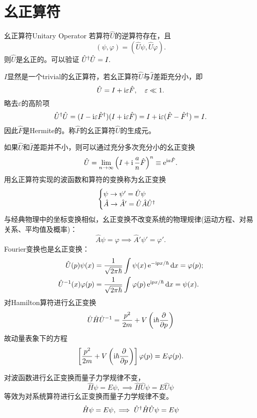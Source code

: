 \section{幺正算符}
\begin{definition}{幺正算符}{Unitary Operator}
	若算符$\hat U$的逆算符存在，且
	\[
		(\psi,\varphi)=(\hat U\psi,\hat U\varphi).
\]
	则$\hat U$是幺正的。可以验证
	$\hat U^\dagger\hat U=I.$
\end{definition}
$I$显然是一个trivial的幺正算符，若幺正算符$\hat U$与$\hat I$差距充分小，即
\[
	\hat U=I+\mathrm{i}\varepsilon\hat F,\quad\varepsilon\ll 1.
\]
略去$\varepsilon$的高阶项
\[
	\hat U^\dagger\hat U=(I-\mathrm{i}\varepsilon\hat F^\dagger)(I+\mathrm{i}\varepsilon\hat F)=I+\mathrm{i}\varepsilon(\hat F-\hat F^\dagger)=I.
\]
因此$\hat F$是Hermite的。称$\hat F$的幺正算符$\hat U$的生成元。

如果$\hat U$和$\hat I$差距并不小，则可以通过充分多次充分小的幺正变换
\begin{align}
	\hat U=\lim_{n\to\infty}\left(I+\mathrm{i}\,\frac an\hat F\right)^n\equiv\mathop{}\!\mathrm{e}^{\mathrm{i} a\hat F}.
\end{align}
用幺正算符实现的波函数和算符的变换称为幺正变换
\begin{align}
	\begin{cases}
		\psi\to\psi'=\hat U\psi\\
		\hat A\to\hat A'=\hat U\hat A\hat U^\dagger
	\end{cases}
\end{align}
与经典物理中的坐标变换相似，幺正变换不改变系统的物理规律(运动方程、对易关系、平均值及概率)：
\[
	\hat A\psi=\varphi\implies\hat A'\psi'=\varphi'.
\]
Fourier变换也是幺正变换：
\begin{align}
	\hat U(p)\psi(x)&=\frac1{\sqrt{2\pi\hbar}}\int\psi(x)\mathop{}\!\mathrm{e}^{-\mathrm{i} px/\hbar}\mathop{}\!\mathrm{d} x=\varphi(p);\\
	\hat U^{-1}(x)\varphi(p)&=\frac1{\sqrt{2\pi\hbar}}\int\varphi(p)\mathop{}\!\mathrm{e}^{\mathrm{i} px/\hbar}\mathop{}\!\mathrm{d} x=\psi(x).
\end{align}
对Hamilton算符进行幺正变换
\begin{align}
	\hat U\hat H\hat U^{-1}=\frac{p^2}{2m}+V\left(\mathrm{i}\hbar\frac{\partial^{{}}}{\partial{p}^{{}}}\right)
\end{align}
故动量表象下的\Schr 方程 
\begin{align}
	\left[\frac{p^2}{2m}+V\left(\mathrm{i}\hbar\frac{\partial^{{}}}{\partial{p}^{{}}}\right)\right]\varphi(p)=E\varphi(p).
\end{align}

对波函数进行幺正变换而量子力学规律不变，
\[
	\hat H\psi=E\psi,\implies\hat H\hat U\psi=E\hat U\psi
\]
等效为对系统算符进行幺正变换而量子力学规律不变。
\[
	\hat H\psi=E\psi,\implies\hat U^\dagger\hat H\hat U\psi=E\psi
\]

